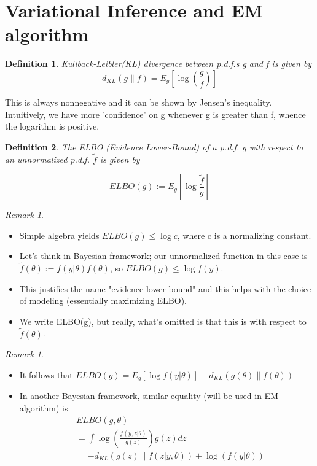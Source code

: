 \documentclass{article}
\newtheorem{definition}{Definition}
\theoremstyle{remark}
\newtheorem{remark}[example]{Remark}
\begin{document}
\section*{Variational Inference and EM algorithm}
\begin{definition}
Kullback-Leibler(KL) divergence between p.d.f.s g and f is given by
    $$d_{KL}(g\|f)=E_g[\log(\frac gf)]$$
\end{definition}
This is always nonnegative and it can be shown by Jensen's inequality. Intuitively, 
we have more 'confidence' on g whenever g is greater than f, whence the logarithm is positive.
\begin{definition}
The ELBO (Evidence Lower-Bound) of a p.d.f. g with respect to an unnormalized p.d.f. $\tilde{f}$ is given by

$$ELBO(g):=E_g[\log \frac{\tilde{f}}{g}]$$
\end{definition}
\begin{remark}
\begin{itemize}
\item Simple algebra yields $ELBO(g)\leq \log c$, where c is a normalizing constant.
\item Let's think in Bayesian framework; our unnormalized function in this case is
    $\tilde{f}(\theta):=f(y\vert \theta)f(\theta)$, so $ELBO(g)\leq\log f(y)$.
\item This justifies the name "evidence lower-bound" and this helps with the choice of modeling (essentially maximizing ELBO).
\item We write ELBO(g), but really, what's omitted is that this is with respect to $\tilde f(\theta)$.
\end{itemize}
\end{remark}
\begin{remark}
    \begin{itemize}
\item It follows that $ELBO(g)=E_g[\log f(y\rvert \theta)]-d_{KL}(g(\theta)\| f(\theta))$
\item In another Bayesian framework, similar equality (will be used in EM algorithm) is
\begin{align*}
        & ELBO(g,\theta)\\
        & =\int \log(\frac{f(y,z\vert\theta)}{g(z)})g(z)dz\\
        & =-d_{KL}(g(z)\| f(z\vert y,\theta))+\log(f(y\vert\theta))
\end{align*}
\end{itemize}
\end{remark}
\end{document}
